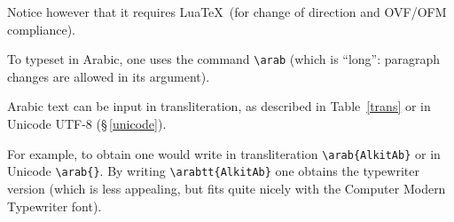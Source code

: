 \documentclass[11pt,a4paper]{article}
\begin{document}
Notice however that it requires Lua\TeX\ (for change of direction and OVF/OFM compliance).

To typeset in Arabic, one uses the command \verb=\arab= (which is ``long'': paragraph changes are allowed in its argument).

Arabic text can be input in transliteration, as described in Table~\ref{trans} or in Unicode UTF-8 (\S\,\ref{unicode}). 

{ For example, to obtain  one would write in transliteration \verb=\arab{=\texttt{AlkitAb}\verb=}= or in Unicode \verb=\arab{=\verb=}=. By writing \verb=\arabtt{=\texttt{AlkitAb}\verb=}= one obtains the typewriter version  (which is less appealing, but fits quite nicely with the Computer Modern Typewriter font).

}
\end{document}
